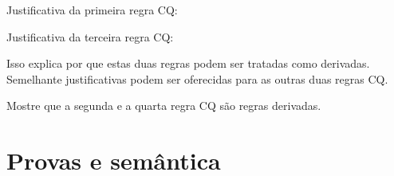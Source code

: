 Justificativa da primeira regra CQ:
\begin{fitchproof}
	\open
		\open
		\close
	\close
\end{fitchproof}
Justificativa da terceira regra CQ:
   
\begin{fitchproof}
	\open
		\open
		\close
	\close
\end{fitchproof}
Isso explica por que estas duas regras podem ser tratadas como derivadas. Semelhante justificativas podem ser oferecidas para as outras duas regras CQ.

\practiceproblems

\problempart
Mostre que a segunda e a quarta regra  CQ s\~ao regras derivadas.


\chapter{Provas e sem\^antica}

